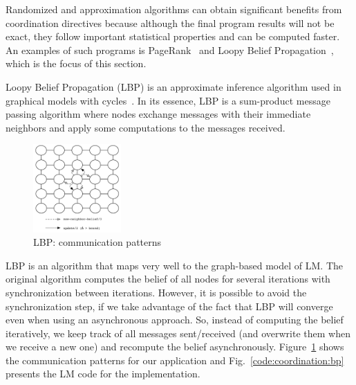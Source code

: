 Randomized and approximation algorithms can obtain significant benefits from
coordination directives because although the final program results will not be
exact, they follow important statistical properties and can be computed faster.
An examples of such programs is PageRank~\cite{Lubachevsky:1986:CAA:4904.4801}
and Loopy Belief Propagation~\cite{Gonzalez+al:aistats09paraml}, which is the
focus of this section.

Loopy Belief Propagation (LBP) is an approximate inference algorithm used in
graphical models with cycles~\cite{Murphy99loopybelief}. In its essence, LBP is
a sum-product message passing algorithm where nodes exchange messages with their
immediate neighbors and apply some computations to the messages received.

\begin{figure}[h]
   \begin{center}
      \includegraphics[width=0.3\textwidth]{figures/bp/bp.pdf}
   \end{center}
\caption{LBP: communication patterns}
\label{fig:coordination:bp}
\end{figure}

LBP is an algorithm that maps very well to the graph-based model of LM. The
original algorithm computes the belief of all nodes for several iterations with
synchronization between iterations. However, it is possible to avoid the
synchronization step, if we take advantage of the fact that LBP will converge
even when using an asynchronous approach. So, instead of computing the belief
iteratively, we keep track of all messages sent/received (and overwrite them
when we receive a new one) and recompute the belief asynchronously.
Figure~\ref{fig:coordination:bp} shows the communication patterns for our
application and Fig.~\ref{code:coordination:bp} presents the LM code for the
implementation.

